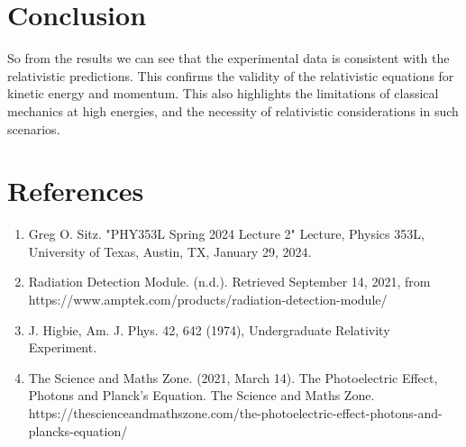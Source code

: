 \documentclass[12pt]{article}
\begin{document}
\section{Conclusion}
        So from the results we can see that the experimental data is consistent with the relativistic predictions. This confirms the validity of the relativistic equations for kinetic energy and momentum. This also highlights the limitations of classical mechanics at high energies, and the necessity of relativistic considerations in such scenarios.


\section{References}
    \begin{enumerate}
        \sloppy

        \item Greg O. Sitz. "PHY353L Spring 2024 Lecture 2" Lecture, Physics 353L, University of Texas, Austin, TX, January 29, 2024.
        \item Radiation Detection Module. (n.d.). Retrieved September 14, 2021, from https://www.amptek.com/products/radiation-detection-module/
        \item J. Higbie, Am. J. Phys. 42, 642 (1974), Undergraduate Relativity Experiment.
        \item The Science and Maths Zone. (2021, March 14). The Photoelectric Effect, Photons and Planck’s Equation. The Science and Maths Zone. https://thescienceandmathszone.com/the-photoelectric-effect-photons-and-plancks-equation/

    \end{enumerate}
\end{document}
